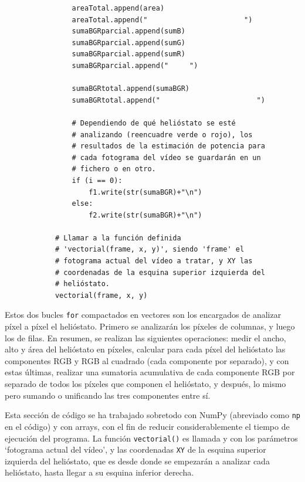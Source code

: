 \begin{lstlisting}
                areaTotal.append(area)
                areaTotal.append("                       ")
                sumaBGRparcial.append(sumB)
                sumaBGRparcial.append(sumG)
                sumaBGRparcial.append(sumR)
                sumaBGRparcial.append("     ")
                
                sumaBGRtotal.append(sumaBGR)
                sumaBGRtotal.append("                       ")
                
                # Dependiendo de qué helióstato se esté
                # analizando (reencuadre verde o rojo), los
                # resultados de la estimación de potencia para
                # cada fotograma del vídeo se guardarán en un
                # fichero o en otro.
                if (i == 0):
                    f1.write(str(sumaBGR)+"\n")  
                else:
                    f2.write(str(sumaBGR)+"\n")

            # Llamar a la función definida
            # 'vectorial(frame, x, y)', siendo 'frame' el
            # fotograma actual del vídeo a tratar, y XY las
            # coordenadas de la esquina superior izquierda del
            # helióstato.
            vectorial(frame, x, y)
\end{lstlisting}
        
Estos dos bucles \verb|for| compactados en vectores son los encargados de analizar píxel a píxel el helióstato. Primero se analizarán los píxeles de columnas, y luego los de filas. En resumen, se realizan las siguientes operaciones: medir el ancho, alto y área del helióstato en píxeles, calcular para cada píxel del helióstato las componentes RGB y RGB al cuadrado (cada componente por separado), y con estas últimas, realizar una sumatoria acumulativa de cada componente RGB por separado de todos los píxeles que componen el helióstato, y después, lo mismo pero sumando o unificando las tres componentes entre sí.

Esta sección de código se ha trabajado sobretodo con NumPy (abreviado como \verb|np| en el código) y con arrays, con el fin de reducir considerablemente el tiempo de ejecución del programa. La función \verb|vectorial()| es llamada y con los parámetros ‘fotograma actual del vídeo’, y las coordenadas \verb|XY| de la esquina superior izquierda del helióstato, que es desde donde se empezarán a analizar cada helióstato, hasta llegar a su esquina inferior derecha.

